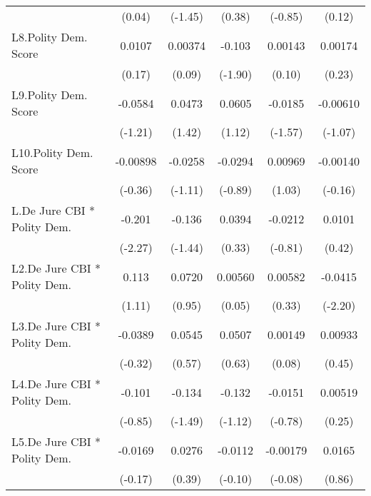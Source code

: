 {\begin{longtable}{l*{5}{c}}
                &   (0.04)         &  (-1.45)         &   (0.38)         &  (-0.85)         &   (0.12)         \\
[1em]
L8.Polity Dem. Score&   0.0107         &  0.00374         &   -0.103         &  0.00143         &  0.00174         \\
                &   (0.17)         &   (0.09)         &  (-1.90)         &   (0.10)         &   (0.23)         \\
[1em]
L9.Polity Dem. Score&  -0.0584         &   0.0473         &   0.0605         &  -0.0185         & -0.00610         \\
                &  (-1.21)         &   (1.42)         &   (1.12)         &  (-1.57)         &  (-1.07)         \\
[1em]
L10.Polity Dem. Score& -0.00898         &  -0.0258         &  -0.0294         &  0.00969         & -0.00140         \\
                &  (-0.36)         &  (-1.11)         &  (-0.89)         &   (1.03)         &  (-0.16)         \\
[1em]
L.De Jure CBI * Polity Dem.&   -0.201\sym{*}  &   -0.136         &   0.0394         &  -0.0212         &   0.0101         \\
                &  (-2.27)         &  (-1.44)         &   (0.33)         &  (-0.81)         &   (0.42)         \\
[1em]
L2.De Jure CBI * Polity Dem.&    0.113         &   0.0720         &  0.00560         &  0.00582         &  -0.0415\sym{*}  \\
                &   (1.11)         &   (0.95)         &   (0.05)         &   (0.33)         &  (-2.20)         \\
[1em]
L3.De Jure CBI * Polity Dem.&  -0.0389         &   0.0545         &   0.0507         &  0.00149         &  0.00933         \\
                &  (-0.32)         &   (0.57)         &   (0.63)         &   (0.08)         &   (0.45)         \\
[1em]
L4.De Jure CBI * Polity Dem.&   -0.101         &   -0.134         &   -0.132         &  -0.0151         &  0.00519         \\
                &  (-0.85)         &  (-1.49)         &  (-1.12)         &  (-0.78)         &   (0.25)         \\
[1em]
L5.De Jure CBI * Polity Dem.&  -0.0169         &   0.0276         &  -0.0112         & -0.00179         &   0.0165         \\
                &  (-0.17)         &   (0.39)         &  (-0.10)         &  (-0.08)         &   (0.86)         \\

\end{longtable}}
